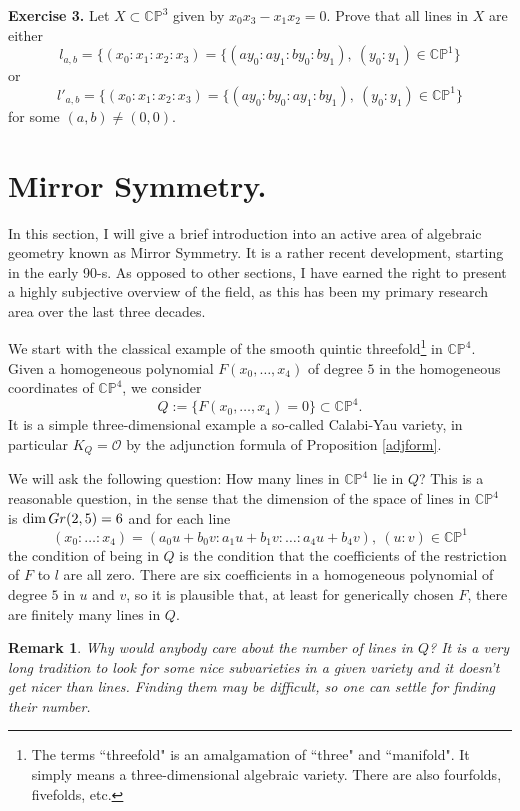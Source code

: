 \documentclass[11pt]{article}
\numberwithin{equation}{section}
\numberwithin{footnote}{section}
\newtheorem{rem}[thm]{Remark}
\newcommand{\blue}{\color{blue}}
\newcommand{\Gr}{{\rm Gr}}
\renewcommand{\P}{{\mathbb P}}
\newcommand{\C}{{\mathbb C}}
\begin{document}
{\bf Exercise 3.} Let $X\subset\C\P^3$ given by $x_0 x_3 - x_1 x_2 = 0$. Prove that all lines in $X$
are either
$$
l_{a,b}=\{
(x_0:x_1:x_2:x_3) = \{(a y_0: a y_1: by_0:b y_1),~(y_0:y_1)\in \C\P^1\}
$$
or 
$$
l'_{a,b}=\{
(x_0:x_1:x_2:x_3) = \{(a y_0: b y_0: ay_1:b y_1),~(y_0:y_1)\in \C\P^1\}
$$
for some $(a,b)\neq(0,0)$.


\section{Mirror Symmetry.}\label{sec.ms}
In this section, I will give a brief introduction into an active area of algebraic geometry known as Mirror Symmetry. It is a rather recent development, starting in the early 90-s. As opposed to other sections, I have earned the right to present a highly subjective overview of the field, as this has been my primary research area over the last three decades.

\smallskip
We start with the classical example of the smooth quintic threefold\footnote{ The terms ``threefold" is an amalgamation of ``three" and ``manifold". It simply means a three-dimensional algebraic variety. There are also fourfolds, fivefolds, etc.} in $\C\P^4$. Given a homogeneous polynomial $F(x_0,\ldots, x_4)$ of degree $5$ in the homogeneous coordinates of $\C\P^4$, we consider 
$$
Q:=\{F(x_0,\ldots, x_4)=0\} \subset \C\P^4.
$$
It is a simple three-dimensional example a so-called {\blue Calabi-Yau variety}, in particular $K_Q = \mathcal O$ by the adjunction formula of Proposition \ref{adjform}.

\smallskip
We will ask the following question: How many lines in $\C\P^4$ lie in $Q$? This is a reasonable question, in the sense that the dimension of the space of lines in $\C\P^4$ is $\dim \Gr(2,5) = 6$ and for each line
$$
(x_0:\ldots:x_4) = (a_0 u + b_0 v: a_1 u + b_1 v:\ldots:a_4 u + b_4 v),~(u:v)\in \C\P^1
$$
the condition of being in $Q$ is the condition that the coefficients of the restriction of $F$ to $l$ are all zero. There are six coefficients in a homogeneous polynomial of degree $5$ in $u$ and $v$, so it is plausible that, at least for generically chosen $F$, there are finitely many lines in $Q$. 

\smallskip
\begin{rem}
Why would anybody care about the number of lines in $Q$? It is a very long tradition to look for some nice subvarieties in a given variety and it doesn't get nicer than lines. Finding them may be difficult, so one can settle for finding their number.
\end{rem}
\end{document}
